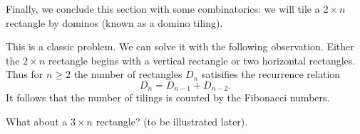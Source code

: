 Finally, we conclude this section with some combinatorics: we will tile a $2 \times n$ rectangle by dominos (known as a domino tiling).

This is a classic problem. We can solve it with the following observation. Either the $2 \times n$ rectangle begins with a vertical rectangle or two horizontal rectangles. Thus for $n \geq 2$ the number of rectangles $D_n$ satisifies the recurrence relation
\[D_n = D_{n-1} + D_{n-2}.\] It follows that the number of tilings is counted by the Fibonacci numbers.

What about a $3\times n$ rectangle? (to be illustrated later).